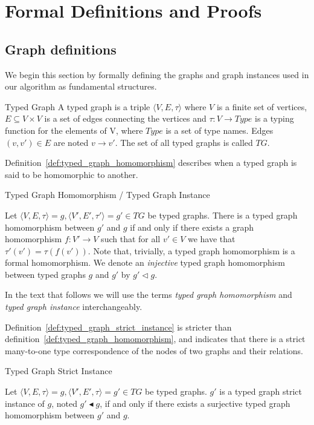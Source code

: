 \section{Formal Definitions and Proofs}
\label{sec:proofs}

\subsection{Graph definitions}

We begin this section by formally defining the graphs and graph instances used in our algorithm as fundamental structures.
\begin{definition}{Typed Graph}
\label{def:typed_graph}
A typed graph is a triple $\langle V,E,\tau\rangle$ where $V$ is a finite set of
vertices, $E\subseteq V\times V$ is a set of edges connecting the vertices and
$\tau:V\rightarrow Type$ is a typing function for the elements of V, where $Type$ is
a set of type names. Edges $(v,v')\in E$ are noted $v\rightarrow v'$. The set of
all typed graphs is called $TG$.
\end{definition}

Definition~\ref{def:typed_graph_homomorphism} describes when a typed graph is said to be homomorphic to another.

\begin{definition}{Typed Graph Homomorphism  / Typed Graph Instance}
\label{def:typed_graph_homomorphism}

Let $\langle V,E,\tau\rangle=g,\langle V',E',\tau'\rangle=g'\in TG$ be typed
graphs. There is a typed graph homomorphism between $g'$ and $g$ if and only if
there exists a graph homomorphism $f:V'\rightarrow V$ such that for all $v'\in
V$ we have that $\tau'(v')=\tau(f(v'))$. Note that, trivially, a typed graph
homomorphism is a formal homomorphism. We denote an \emph{injective} typed graph
homomorphism between typed graphs $g$ and $g'$ by $g' \vartriangleleft g$.
\end{definition}

In the text that follows we will use the terms \emph{typed graph homomorphism}
and \emph{typed graph instance} interchangeably.

Definition~\ref{def:typed_graph_strict_instance} is stricter than
definition~\ref{def:typed_graph_homomorphism}, and indicates that there is a
strict many-to-one type correspondence of the nodes of two graphs and their
relations.

\begin{definition}{Typed Graph Strict Instance}
\label{def:typed_graph_strict_instance}

Let $\langle V,E,\tau\rangle=g,\langle V',E',\tau\rangle=g'\in TG$ be typed
graphs. $g'$ is a typed graph strict instance of $g$, noted $g'
\blacktriangleleft g$, if and only if there exists a surjective
typed graph homomorphism between $g'$ and $g$.

\end{definition}

